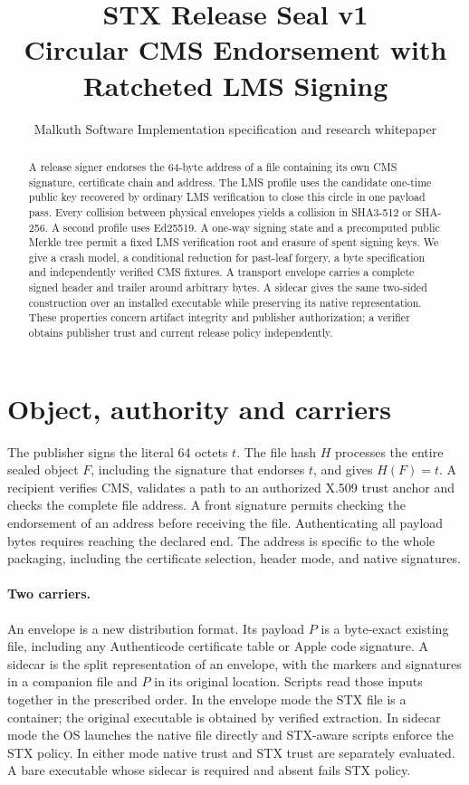\documentclass[10pt,twocolumn,letterpaper]{article}
\title{\vspace{-1.8em}\bfseries STX Release Seal v1\\[2pt]\large Circular CMS Endorsement with Ratcheted LMS Signing}
\author{\normalsize Malkuth Software \qquad Implementation specification and research whitepaper}
\date{}
\begin{document}
\maketitle
\begin{abstract}
A release signer endorses the 64-byte address of a file containing its own CMS signature, certificate chain and address. The LMS profile uses the candidate one-time public key recovered by ordinary LMS verification to close this circle in one payload pass. Every collision between physical envelopes yields a collision in SHA3-512 or SHA-256. A second profile uses Ed25519. A one-way signing state and a precomputed public Merkle tree permit a fixed LMS verification root and erasure of spent signing keys. We give a crash model, a conditional reduction for past-leaf forgery, a byte specification and independently verified CMS fixtures. A transport envelope carries a complete signed header and trailer around arbitrary bytes. A sidecar gives the same two-sided construction over an installed executable while preserving its native representation. These properties concern artifact integrity and publisher authorization; a verifier obtains publisher trust and current release policy independently.
\end{abstract}

\section{Object, authority and carriers}
The publisher signs the literal 64 octets $t$. The file hash $H$ processes the entire sealed object $F$, including the signature that endorses $t$, and gives $H(F)=t$. A recipient verifies CMS, validates a path to an authorized X.509 trust anchor and checks the complete file address. A front signature permits checking the endorsement of an address before receiving the file. Authenticating all payload bytes requires reaching the declared end. The address is specific to the whole packaging, including the certificate selection, header mode, and native signatures.

\paragraph{Two carriers.}
An envelope is a new distribution format. Its payload $P$ is a byte-exact existing file, including any Authenticode certificate table or Apple code signature. A sidecar is the split representation of an envelope, with the markers and signatures in a companion file and $P$ in its original location. Scripts read those inputs together in the prescribed order. In the envelope mode the STX file is a container; the original executable is obtained by verified extraction. In sidecar mode the OS launches the native file directly and STX-aware scripts enforce the STX policy. In either mode native trust and STX trust are separately evaluated. A bare executable whose sidecar is required and absent fails STX policy.
\end{document}
